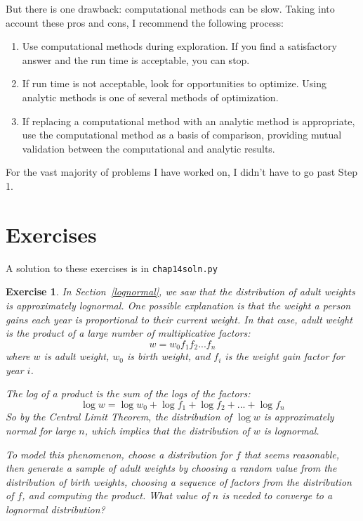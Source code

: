 \documentclass[12pt]{book}
\theoremstyle{exercise}
\newtheorem{exercise}{Exercise}[chapter]
\begin{document}
But there is one drawback: computational methods can be slow.  Taking
into account these pros and cons, I recommend the following process:

\begin{enumerate}

\item Use computational methods during exploration.  If you find a
  satisfactory answer and the run time is acceptable, you can stop.%

\item If run time is not acceptable, look for opportunities to
  optimize.  Using analytic methods is one of several methods of
  optimization.

\item If replacing a computational method with an analytic method is
  appropriate, use the computational method as a basis of comparison, 
  providing mutual validation between the computational and
  analytic results.%

\end{enumerate}

For the vast majority of problems I have worked on, I didn't have
to go past Step 1.


\section{Exercises}

A solution to these exercises is in \verb"chap14soln.py"

\begin{exercise}%
\label{log_clt}
In Section~\ref{lognormal}, we saw that the distribution
of adult weights is approximately lognormal.  One possible
explanation is that the weight a person
gains each year is proportional to their current weight.
In that case, adult weight is the product of a large number
of multiplicative factors:
%
\[ w = w_0 f_1 f_2 ... f_n  \]
%
where $w$ is adult weight, $w_0$ is birth weight, and $f_i$
is the weight gain factor for year $i$.%
%
%
%
%

The log of a product is the sum of the logs of the
factors:
%
\[ \log w = \log w_0 + \log f_1 + \log f_2 + ... + \log f_n \]
%
So by the Central Limit Theorem, the distribution of $\log w$ is
approximately normal for large $n$, which implies that the
distribution of $w$ is lognormal.%
%

To model this phenomenon, choose a distribution for $f$ that seems
reasonable, then generate a sample of adult weights by choosing a
random value from the distribution of birth weights, choosing a
sequence of factors from the distribution of $f$, and computing the
product.  What value of $n$ is needed to converge to a lognormal
distribution?%
%
%

\end{exercise}
\end{document}
